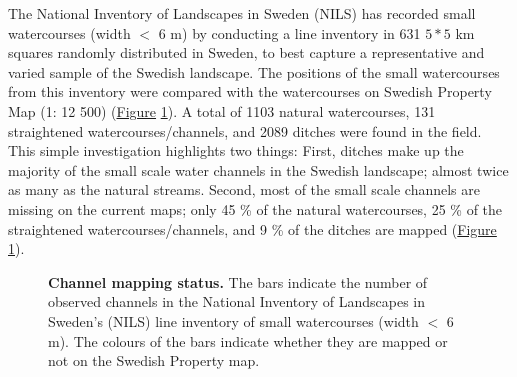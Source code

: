 \documentclass[11pt, review]{elsarticle} %
\begin{document}
The National Inventory of Landscapes in Sweden (NILS) has recorded small watercourses (width $<$ 6 m) by conducting a line inventory in 631 $5*5$ km squares randomly distributed in Sweden, to best capture a representative and varied sample of the Swedish landscape. The positions of the small watercourses from this inventory were compared with the watercourses on Swedish Property Map (1: 12 500) (\hyperref[fig:watercoursebarplot]{Figure} \ref{fig:watercoursebarplot}). A total of 1103 natural watercourses, 131 straightened watercourses/channels, and 2089 ditches were found in the field. This simple investigation highlights two things: First, ditches make up the majority of the small scale water channels in the Swedish landscape; almost twice as many as the natural streams. Second, most of the small scale channels are missing on the current maps; only 45 \% of the natural watercourses, 25 \% of the straightened watercourses/channels, and 9 \% of the ditches are mapped (\hyperref[fig:watercoursebarplot]{Figure} \ref{fig:watercoursebarplot}).

\begin{figure}[!htb]
    \centering
    \caption{\textbf{Channel mapping status.} The bars indicate the number of observed channels in the National Inventory of Landscapes in Sweden's (NILS) line inventory of small watercourses (width $<$ 6 m). The colours of the bars indicate whether they are mapped or not on the Swedish Property map.}
    \label{fig:watercoursebarplot}
\end{figure}
\end{document}
